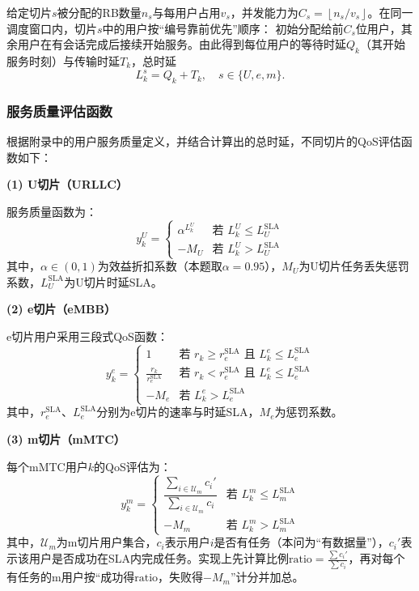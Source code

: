 给定切片$s$被分配的RB数量$n_s$与每用户占用$v_s$，并发能力为$C_s=\left\lfloor n_s / v_s \right\rfloor$。在同一调度窗口内，切片$s$中的用户按“编号靠前优先”顺序：
初始分配给前$C_s$位用户，其余用户在有会话完成后接续开始服务。由此得到每位用户的等待时延$Q_k$（其开始服务时刻）与传输时延$T_k$，总时延
\begin{equation}
L_k^{s} = Q_k + T_k, \quad s \in \{U, e, m\}.
\end{equation}

\subsubsection{服务质量评估函数}

根据附录中的用户服务质量定义，并结合计算出的总时延，不同切片的QoS评估函数如下：

\textbf{(1) U切片（URLLC）}

服务质量函数为：
\begin{equation}
y_k^{U} = \begin{cases}
\alpha^{L_k^{U}} & \text{若 } L_k^{U} \leq L_{U}^{\text{SLA}} \\
-M_{U} & \text{若 } L_k^{U} > L_{U}^{\text{SLA}}
\end{cases}
\end{equation}
其中，$\alpha\in(0,1)$为效益折扣系数（本题取$\alpha=0.95$），$M_U$为U切片任务丢失惩罚系数，$L_U^{\text{SLA}}$为U切片时延SLA。

\textbf{(2) e切片（eMBB）}

e切片用户采用三段式QoS函数：
\begin{equation}
y_k^{e} = \begin{cases}
1 & \text{若 } r_k \geq r_{e}^{\text{SLA}} \text{ 且 } L_k^{e} \leq L_{e}^{\text{SLA}} \\
\frac{r_k}{r_{e}^{\text{SLA}}} & \text{若 } r_k < r_{e}^{\text{SLA}} \text{ 且 } L_k^{e} \leq L_{e}^{\text{SLA}} \\
-M_{e} & \text{若 } L_k^{e} > L_{e}^{\text{SLA}}
\end{cases}
\end{equation}
其中，$r_e^{\text{SLA}}$、$L_e^{\text{SLA}}$分别为e切片的速率与时延SLA，$M_e$为惩罚系数。

\textbf{(3) m切片（mMTC）}

每个mMTC用户$k$的QoS评估为：
\begin{equation}
y_k^{m} = \begin{cases}
\dfrac{\sum_{i \in \mathcal{U}_{m}} c_i'}{\sum_{i \in \mathcal{U}_{m}} c_i} & \text{若 } L_k^{m} \le L_{m}^{\text{SLA}} \\
-M_{m} & \text{若 } L_k^{m} > L_{m}^{\text{SLA}}
\end{cases}
\end{equation}
其中，$\mathcal{U}_m$为m切片用户集合，$c_i$表示用户$i$是否有任务（本问为“有数据量”），$c_i'$表示该用户是否成功在SLA内完成任务。实现上先计算比例$\text{ratio}=\frac{\sum c_i'}{\sum c_i}$，再对每个有任务的m用户按“成功得$\text{ratio}$，失败得$-M_m$”计分并加总。

